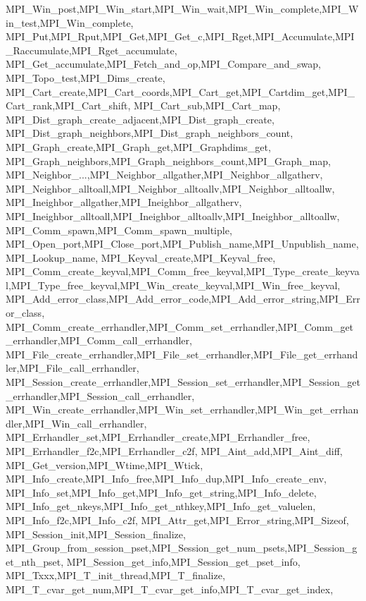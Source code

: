 {{{{{    MPI_Win_post,MPI_Win_start,MPI_Win_wait,MPI_Win_complete,MPI_Win_test,MPI_Win_complete,
    MPI_Put,MPI_Rput,MPI_Get,MPI_Get_c,MPI_Rget,MPI_Accumulate,MPI_Raccumulate,MPI_Rget_accumulate,
    MPI_Get_accumulate,MPI_Fetch_and_op,MPI_Compare_and_swap,
    MPI_Topo_test,MPI_Dims_create,
    MPI_Cart_create,MPI_Cart_coords,MPI_Cart_get,MPI_Cartdim_get,MPI_Cart_rank,MPI_Cart_shift,
    MPI_Cart_sub,MPI_Cart_map,
    MPI_Dist_graph_create_adjacent,MPI_Dist_graph_create,
    MPI_Dist_graph_neighbors,MPI_Dist_graph_neighbors_count,
    MPI_Graph_create,MPI_Graph_get,MPI_Graphdims_get,
    MPI_Graph_neighbors,MPI_Graph_neighbors_count,MPI_Graph_map,
    MPI_Neighbor_...,MPI_Neighbor_allgather,MPI_Neighbor_allgatherv,
    MPI_Neighbor_alltoall,MPI_Neighbor_alltoallv,MPI_Neighbor_alltoallw,
    MPI_Ineighbor_allgather,MPI_Ineighbor_allgatherv,
    MPI_Ineighbor_alltoall,MPI_Ineighbor_alltoallv,MPI_Ineighbor_alltoallw,
    MPI_Comm_spawn,MPI_Comm_spawn_multiple,
    MPI_Open_port,MPI_Close_port,MPI_Publish_name,MPI_Unpublish_name,MPI_Lookup_name,
    MPI_Keyval_create,MPI_Keyval_free,
    MPI_Comm_create_keyval,MPI_Comm_free_keyval,MPI_Type_create_keyval,MPI_Type_free_keyval,MPI_Win_create_keyval,MPI_Win_free_keyval,
    MPI_Add_error_class,MPI_Add_error_code,MPI_Add_error_string,MPI_Error_class,
    MPI_Comm_create_errhandler,MPI_Comm_set_errhandler,MPI_Comm_get_errhandler,MPI_Comm_call_errhandler,
    MPI_File_create_errhandler,MPI_File_set_errhandler,MPI_File_get_errhandler,MPI_File_call_errhandler,
    MPI_Session_create_errhandler,MPI_Session_set_errhandler,MPI_Session_get_errhandler,MPI_Session_call_errhandler,
    MPI_Win_create_errhandler,MPI_Win_set_errhandler,MPI_Win_get_errhandler,MPI_Win_call_errhandler,
    MPI_Errhandler_set,MPI_Errhandler_create,MPI_Errhandler_free,
    MPI_Errhandler_f2c,MPI_Errhandler_c2f,
    MPI_Aint_add,MPI_Aint_diff,
    MPI_Get_version,MPI_Wtime,MPI_Wtick,
    MPI_Info_create,MPI_Info_free,MPI_Info_dup,MPI_Info_create_env,
    MPI_Info_set,MPI_Info_get,MPI_Info_get_string,MPI_Info_delete,
    MPI_Info_get_nkeys,MPI_Info_get_nthkey,MPI_Info_get_valuelen,
    MPI_Info_f2c,MPI_Info_c2f,
    MPI_Attr_get,MPI_Error_string,MPI_Sizeof,
    MPI_Session_init,MPI_Session_finalize,
    MPI_Group_from_session_pset,MPI_Session_get_num_psets,MPI_Session_get_nth_pset,
    MPI_Session_get_info,MPI_Session_get_pset_info,
    MPI_Txxx,MPI_T_init_thread,MPI_T_finalize,
    MPI_T_cvar_get_num,MPI_T_cvar_get_info,MPI_T_cvar_get_index,
}}}}}
